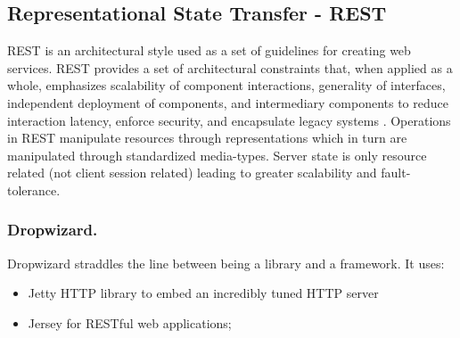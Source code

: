 \subsection{Representational State Transfer - REST}
REST is an architectural style used as a set of guidelines for creating web services. REST provides a set of architectural constraints that, when applied as a whole, emphasizes scalability of component interactions, generality of interfaces, independent deployment of components, and intermediary components to reduce interaction latency, enforce security, and encapsulate legacy systems \cite{fielding}. Operations in REST manipulate resources through representations which in turn are manipulated through standardized media-types. Server state is only resource related (not client session related) leading to greater scalability and fault-tolerance.


\subsubsection{Dropwizard.}
Dropwizard straddles the line between being a library and a framework. It uses:
\begin{itemize}
\item Jetty HTTP library to embed an incredibly tuned HTTP server
\item Jersey for RESTful web applications;
\end{itemize}